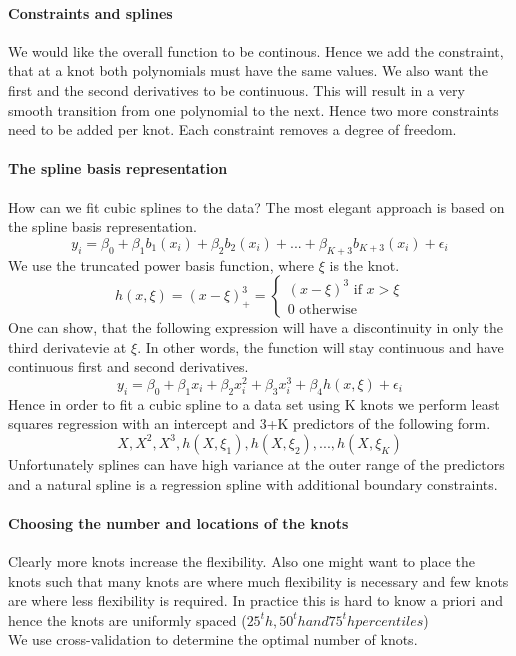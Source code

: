 \documentclass[../document.tex]{subfiles}
\begin{document}
	\paragraph{Constraints and splines}
	We would like the overall function to be continous. Hence we add the constraint, that at a knot both polynomials must have the same values. We also want the first and the second derivatives to be continuous. This will result in a very smooth transition from one polynomial to the next. Hence two more constraints need to be added per knot. Each constraint removes a degree of freedom.
	\paragraph{The spline basis representation}
	How can we fit cubic splines to the data? The most elegant approach is based on the spline basis representation. 
	\begin{equation}
		y_{i}=\beta_{0}+\beta_{1}b_{1}(x_{i})+\beta_{2}b_{2}(x_{i})+...+\beta_{K+3}b_{K+3}(x_{i})+\epsilon_{i}
	\end{equation}
	We use the truncated power basis function, where \(\xi\) is the knot.
	\begin{equation}
		h(x,\xi)=(x-\xi)_{+}^3=
		\begin{cases}
			(x-\xi)^3 \text{  if  } x > \xi\\
			0 \text{  otherwise  }
		\end{cases}
	\end{equation}
	One can show, that the following expression will have a discontinuity in only the third derivatevie at \(\xi\). In other words, the function will stay continuous and have continuous first and second derivatives.
	\begin{equation}
		y_{i}=\beta_{0}+\beta_{1}x_{i}+\beta_{2}x_{i}^2+\beta_{3}x_{i}^3+\beta_{4}h(x,\xi)+\epsilon_{i}
	\end{equation}
	Hence in order to fit a cubic spline to a data set using K knots we perform least squares regression with an intercept and 3+K predictors of the following form.
	\begin{equation}
		X, X^2, X^3, h(X,\xi_{1}),h(X,\xi_{2}),...,h(X,\xi_{K})
	\end{equation}
	Unfortunately splines can have high variance at the outer range of the predictors and a natural spline is a regression spline with additional boundary constraints.
	\paragraph{Choosing the number and locations of the knots}
	Clearly more knots increase the flexibility. Also one might want to place the knots such that many knots are where much flexibility is necessary and few knots are where less flexibility is required. In practice this is hard to know a priori and hence the knots are uniformly spaced (\(25^th,50^th and 75^th percentiles\))\\
	We use cross-validation to determine the optimal number of knots.
\end{document}
